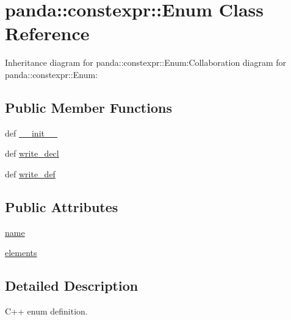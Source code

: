 \hypertarget{classpanda_1_1constexpr_1_1Enum}{
\section{panda::constexpr::Enum Class Reference}
\label{classpanda_1_1constexpr_1_1Enum}
}
Inheritance diagram for panda::constexpr::Enum:Collaboration diagram for panda::constexpr::Enum:\subsection*{Public Member Functions}
\begin{DoxyCompactItemize}
\item 
def \hyperlink{classpanda_1_1constexpr_1_1Enum_a129f848f4aaa3a1ff63e4655c242279d}{\_\-\_\-init\_\-\_\-}
\item 
def \hyperlink{classpanda_1_1constexpr_1_1Enum_a0d09200b659f7c2b2373502916623c13}{write\_\-decl}
\item 
def \hyperlink{classpanda_1_1constexpr_1_1Enum_acb10c196f9abf5d6564238ed90d6e8d9}{write\_\-def}
\end{DoxyCompactItemize}
\subsection*{Public Attributes}
\begin{DoxyCompactItemize}
\item 
\hyperlink{classpanda_1_1constexpr_1_1Enum_a89277239b782a6cc98862cd99d22664f}{name}
\item 
\hyperlink{classpanda_1_1constexpr_1_1Enum_aa004eb62566d3abc699fa9493103dc1c}{elements}
\end{DoxyCompactItemize}


\subsection{Detailed Description}
\begin{DoxyVerb}
C++ enum definition.
\end{DoxyVerb}
 

